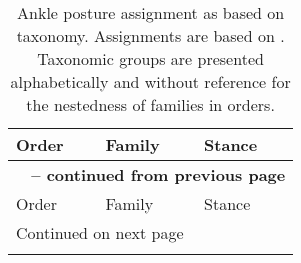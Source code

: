 \newpage
\begin{center}
  \begin{longtable}{ l l l }
    \caption[Posture assignment based on taxonomy]{Ankle posture assignment as based on taxonomy. Assignments are based on \citep{Carrano1999}. Taxonomic groups are presented alphabetically and without reference for the nestedness of families in orders.} \label{tab:posture} \\

    \hline
    Order & Family & Stance \\ \hline
    \endfirsthead
  
    \multicolumn{3}{p{\textwidth}}{{ \bfseries \tablename\ \thetable{} -- continued from previous page}} \\
    \hline Order & Family & Stance \\ \hline
    \endhead
      
    \hline \multicolumn{3}{p{\textwidth}}{{Continued on next page}} \\ \hline
    \endfoot
  
    \hline \hline
    \endlastfoot
  

\end{longtable}
\end{center}
